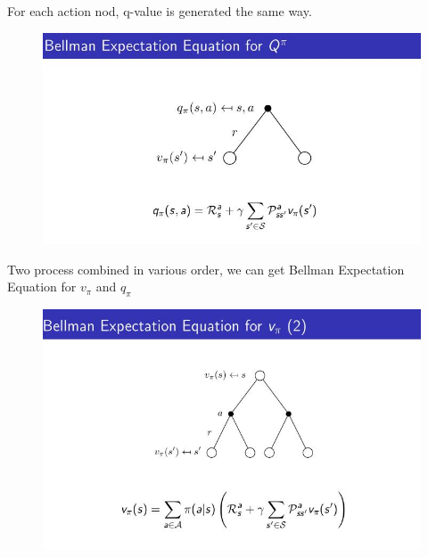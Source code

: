 \documentclass[10pt, a4paper, twocolumn]{article} %
\begin{document}
For each action nod, q-value is generated the same way.
\begin{figure}[H]
	\begin{centering}
		\includegraphics[width = \linewidth]{bellmanQ.jpg}
	\end{centering}
\end{figure}

Two process combined in various order, we can get Bellman Expectation Equation for $v_{\pi}$ and $q_{\pi}$

\begin{figure}[H]
	\begin{centering}
		\includegraphics[width = \linewidth]{bellmanVpi.jpg}
	\end{centering}
\end{figure}
\end{document}
